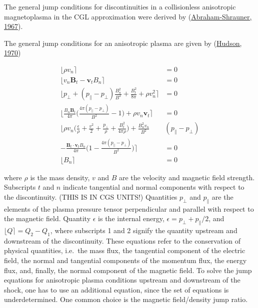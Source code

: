 \documentclass[
  notoc %
]{tufte-book}
\begin{document}
The general jump conditions for discontinuities in a collisionless
anisotropic magnetoplasma in the CGL approximation were derived by
(\protect\hyperlink{ref-abraham1967shock}{Abraham-Shrauner, 1967}).

The general jump conditions for an anisotropic plasma are given by
(\protect\hyperlink{ref-hudson1970discontinuities}{Hudson, 1970})

\[
\begin{aligned}
\lfloor \rho v_n \rceil &= 0 \\
\lfloor v_n\mathbf{B}_t - \mathbf{v}_t B_n \rceil &= 0 \\
\lfloor p_\perp + (p_\parallel - p_\perp)\frac{B_n^2}{B^2} + \frac{B_t^2}{8\pi} + \rho v_n^2 \rceil &= 0 \\
\lfloor \frac{B_n \mathbf{B}_t}{4\pi}\Big( \frac{4\pi(p_\parallel - p_\perp)}{B^2} - 1 \Big) +\rho v_n \mathbf{v}_t \rceil &= 0 \\
\lfloor \rho v_n\Big( \frac{\epsilon}{\rho} + \frac{v^2}{2} + \frac{p_\perp}{\rho} + \frac{B_t^2}{4\pi \rho} \Big) + \frac{B_n^2 v_n}{B^2}&(p_\parallel - p_\perp) \\
- \frac{\mathbf{B}_t\cdot\mathbf{v}_t B_n}{4\pi}\Big( 1 - \frac{4\pi(p_\parallel - p_\perp)}{B^2} \Big) \rceil &= 0 \\
\lfloor B_n \rceil &= 0
\end{aligned}
\]

where \(\rho\) is the mass density, \(v\) and \(B\) are the velocity and
magnetic field strength. Subscripts \(t\) and \(n\) indicate tangential
and normal components with respect to the discontinuity. (THIS IS IN CGS
UNITS!) Quantities \(p_\perp\) and \(p_\parallel\) are the elements of
the plasma pressure tensor perpendicular and parallel with respect to
the magnetic field. Quantity \(\epsilon\) is the internal energy,
\(\epsilon = p_\perp + p_\parallel/2\), and
\(\lfloor Q \rceil = Q_2 - Q_1\), where subscripts 1 and 2 signify the
quantity upstream and downstream of the discontinuity. These equations
refer to the conservation of physical quantities, i.e.~the mass flux,
the tangential component of the electric field, the normal and
tangential components of the momentum flux, the energy flux, and,
finally, the normal component of the magnetic field. To solve the jump
equations for anisotropic plasma conditions upstream and downstream of
the shock, one has to use an additional equation, since the set of
equations is underdetermined. One common choice is the magnetic
field/density jump ratio.
\end{document}
